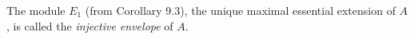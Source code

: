 The module $E_1$ (from Corollary 9.3), the unique maximal essential extension of $A$, is called the \textit{injective envelope} of $A$.
